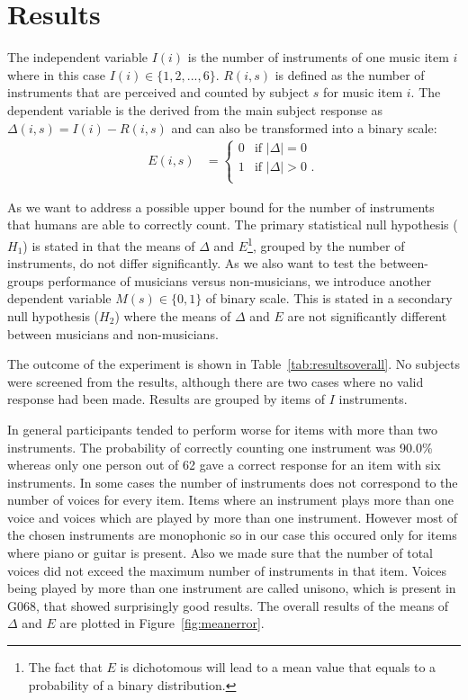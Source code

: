 \section{Results}

The independent variable $I(i)$ is the number of instruments of one music item $i$ where in this case $I(i) \in \{1,2,...,6\}$. $R(i,s)$ is defined as the number of instruments that are perceived and counted by subject $s$ for music item $i$. The dependent variable is the derived from the main subject response as $\Delta(i,s) = I(i) - R(i,s)$ and can also be transformed into a binary scale:
\begin{align*}
	E(i,s)&=\begin{cases}
		0 & \text{if $|\Delta| = 0 $ } \\
		1 & \text{if $|\Delta| > 0 $ .}\\
	\end{cases}
\end{align*}

As we want to address a possible upper bound for the number of instruments that humans are able to correctly count. The primary statistical null hypothesis ($H_1$) is stated in that the means of $\Delta$ and $E$\footnote{The fact that $E$ is dichotomous will lead to a mean value that equals to a probability of a binary distribution.}, grouped by the number of instruments, do not differ significantly. As we also want to test the between-groups performance of musicians versus non-musicians, we introduce another dependent variable $M(s) \in \{0,1\}$ of binary scale. This is stated in a secondary null hypothesis ($H_2$) where the means of $\Delta$ and $E$ are not significantly different between musicians and non-musicians.

The outcome of the experiment is shown in Table~\ref{tab:resultsoverall}. No subjects were screened from the results, although there are two cases where no valid response had been made. Results are grouped by items of $I$ instruments.

In general participants tended to perform worse for items with more than two instruments. The probability of correctly counting one instrument was 90.0\% whereas only one person out of 62 gave a correct response for an item with six instruments. In some cases the number of instruments does not correspond to the number of voices for every item. Items where an instrument plays more than one voice and voices which are played by more than one instrument. However most of the chosen instruments are monophonic so in our case this occured only for items where piano or guitar is present. Also we made sure that the number of total voices did not exceed the maximum number of instruments in that item. Voices being played by more than one instrument are called unisono, which is present in G068, that showed surprisingly good results.
The overall results of the means of $\Delta$ and $E$ are plotted in Figure~\ref{fig:meanerror}.


